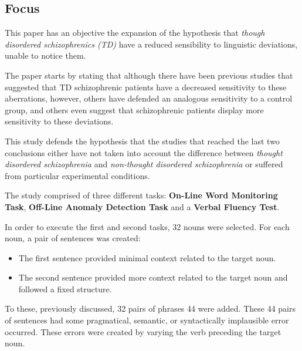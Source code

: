 \documentclass{Paper_Summary}
\begin{document}
\makepapertitle

\breakline

\begin{center}
    \section*{Focus}
\end{center}
    
    This paper has an objective the expansion of the hypothesis that \emph{though disordered schizophrenics (TD)} have a reduced sensibility to linguistic deviations, unable to notice them.

    The paper starts by stating that although there have been previous studies that suggested that TD schizophrenic patients have a decreased sensitivity to these aberrations, however, others have defended an analogous sensitivity to a control group, and others even suggest that schizophrenic patients display more sensitivity to these deviations.

    This study defends the hypothesis that the studies that reached the last two conclusions either have not taken into account the difference between \emph{thought disordered schizophrenia} and \emph{non-thought disordered schizophrenia} or suffered from particular experimental conditions.
    
    The study comprised of three different tasks: \textbf{On-Line Word Monitoring Task}, \textbf{Off-Line Anomaly Detection Task} and a \textbf{Verbal Fluency Test}.

    In order to execute the first and second tasks, 32 nouns were selected. For each noun, a pair of sentences was created:
    \begin{itemize}
        \item The first sentence provided minimal context related to the target noun.
        \item The second sentence provided more context related to the target noun and followed a fixed structure.
    \end{itemize}

    To these, previously discussed, 32 pairs of phrases 44 were added. These 44 pairs of sentences had some pragmatical, semantic, or syntactically implausible error occurred. These errors were created by varying the verb preceding the target noun.

\breakline

\newpage
\end{document}
